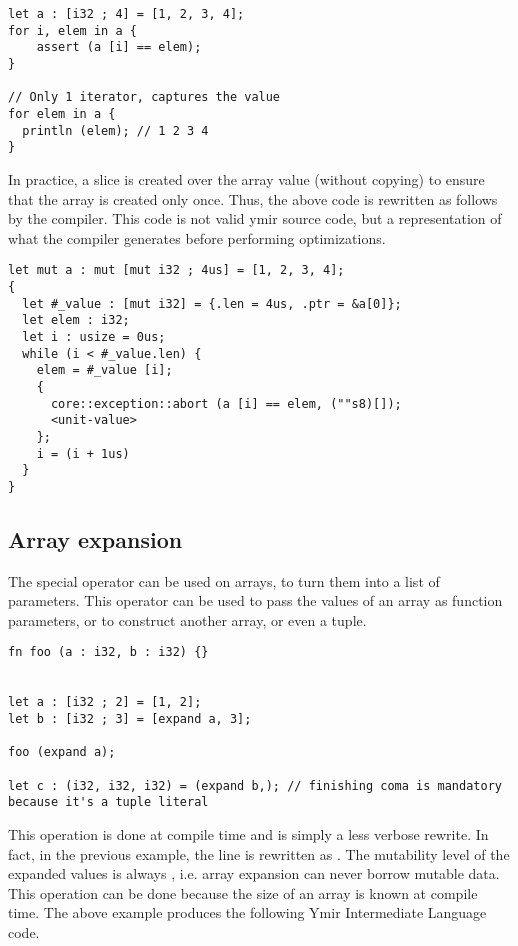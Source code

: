 \begin{lstlisting}[style=coloredverbatim]
let a : [i32 ; 4] = [1, 2, 3, 4];
for i, elem in a {
    assert (a [i] == elem);
}

// Only 1 iterator, captures the value
for elem in a {
  println (elem); // 1 2 3 4
}
\end{lstlisting}

In practice, a slice is created over the array value (without copying) to ensure
that the array is created only once. Thus, the above code is rewritten as
follows by the compiler. This code is not valid ymir source code, but a
representation of what the compiler generates before performing optimizations.

\begin{lstlisting}[style=intermediateVerb]
let mut a : mut [mut i32 ; 4us] = [1, 2, 3, 4];
{
  let #_value : [mut i32] = {.len = 4us, .ptr = &a[0]};
  let elem : i32;
  let i : usize = 0us;
  while (i < #_value.len) {
    elem = #_value [i];
    {
      core::exception::abort (a [i] == elem, (""s8)[]);
      <unit-value>
    };
    i = (i + 1us)
  }
}
\end{lstlisting}


\subsection {Array expansion}

The special operator  can be used on arrays, to turn them into a
list of parameters. This operator can be used to pass the values of an array as
function parameters, or to construct another array, or even a tuple.

\begin{lstlisting}[style=coloredverbatim]
fn foo (a : i32, b : i32) {}


let a : [i32 ; 2] = [1, 2];
let b : [i32 ; 3] = [expand a, 3];

foo (expand a);

let c : (i32, i32, i32) = (expand b,); // finishing coma is mandatory because it's a tuple literal
\end{lstlisting}

This operation is done at compile time and is simply a less verbose rewrite. In
fact, in the previous example, the line  is rewritten as
. The mutability level of the expanded values is
always , i.e. array expansion can never borrow mutable data. This
operation can be done because the size of an array is known at compile time. The
above example produces the following Ymir Intermediate Language code.

